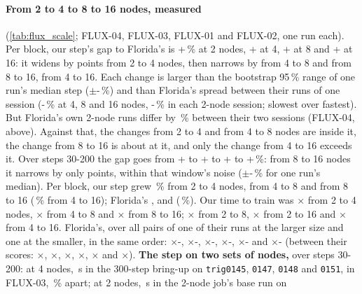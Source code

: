 \paragraph{From 2 to 4 to 8 to 16 nodes, measured} (\cref{tab:flux_scale}; FLUX-04, FLUX-03, FLUX-01 and FLUX-02, one run each). Per block, our step's gap to Florida's is +\TriFxTwoStepPct\,\% at 2 nodes, +\TriFxFourStepPct{} at 4, +\TriFxStepPct{} at 8 and +\TriFxSixteenStepPct{} at 16: it widens by \TriFxScaleWidenFourTwo{} points from 2 to 4 nodes, then narrows by \TriFxScaleNarrowEightFour{} from 4 to 8 and \TriFxScaleNarrowSixteenEight{} from 8 to 16, \TriFxScaleNarrow{} from 4 to 16. Each change is larger than the bootstrap 95\,\% range of one run's median step ($\pm$\TriFxScaleBootLo-\TriFxScaleBootHi\,\%) and than Florida's spread between their runs of one session (\TriFxScaleFlSpreadLo-\TriFxScaleFlSpreadHi\,\% at 4, 8 and 16 nodes, \TriFxScaleFlSessionSpreadLo-\TriFxScaleFlSessionSpreadHi\,\% in each 2-node session; slowest over fastest). But Florida's own 2-node runs differ by \TriFxScaleFlSessionPct\,\% between their two sessions (FLUX-04, above). Against that, the changes from 2 to 4 and from 4 to 8 nodes are inside it, the change from 8 to 16 is about at it, and only the change from 4 to 16 exceeds it. Over steps 30-200 the gap goes from +\TriFxTwoTenPct{} to +\TriFxFourTenPct{} to +\TriFxScaleTenGapEight{} to +\TriFxSixteenTenPct\,\%: from 8 to 16 nodes it narrows by only \TriFxScaleTenNarrow{} points, within that window's noise ($\pm$\TriFxScaleTenBootLo-\TriFxScaleTenBootHi\,\% for one run's median). Per block, our step grew \TriFxScaleStepFourTwo\,\% from 2 to 4 nodes, \TriFxScaleStepEightFour{} from 4 to 8 and \TriFxSixteenStepScale{} from 8 to 16 (\TriFxScaleStepSixteenFour\,\% from 4 to 16); Florida's \TriFxScaleFlStepFourTwo, \TriFxScaleFlStepEightFour{} and \TriFxSixteenFlStepScale{} (\TriFxScaleFlStepSixteenFour\,\%). Our time to train was $\times$\TriFxScaleTttFourTwo{} from 2 to 4 nodes, $\times$\TriFxScaleTttEightFour{} from 4 to 8 and $\times$\TriFxSixteenTttRatio{} from 8 to 16; $\times$\TriFxScaleTttEightTwo{} from 2 to 8, $\times$\TriFxScaleTttSixteenTwo{} from 2 to 16 and $\times$\TriFxScaleTttSixteenFour{} from 4 to 16. Florida's, over all pairs of one of their runs at the larger size and one at the smaller, in the same order: $\times$\TriFxScaleFlPairLoFourTwo-\TriFxScaleFlPairHiFourTwo, $\times$\TriFxScaleFlPairLoEightFour-\TriFxScaleFlPairHiEightFour, $\times$\TriFxSixteenFlPairLo-\TriFxSixteenFlPairHi, $\times$\TriFxScaleFlPairLoEightTwo-\TriFxScaleFlPairHiEightTwo, $\times$\TriFxScaleFlPairLoSixteenTwo-\TriFxScaleFlPairHiSixteenTwo{} and $\times$\TriFxScaleFlPairLoSixteenFour-\TriFxScaleFlPairHiSixteenFour{} (between their scores: $\times$\TriFxScaleFlTttFourTwo, $\times$\TriFxScaleFlTttEightFour, $\times$\TriFxSixteenFlTttRatio, $\times$\TriFxScaleFlTttEightTwo, $\times$\TriFxScaleFlTttSixteenTwo{} and $\times$\TriFxScaleFlTttSixteenFour). \textbf{The step on two sets of nodes,} over steps 30-200: at 4 nodes, \TriFxScaleSetsTen\,s in the 300-step bring-up on \texttt{trig0145}, \texttt{0147}, \texttt{0148} and \texttt{0151}, \TriFxFourTen{} in FLUX-03, \TriFxScaleSetsPct\,\% apart; at 2 nodes, \TriFxGapBase\,s in the 2-node job's base run on 